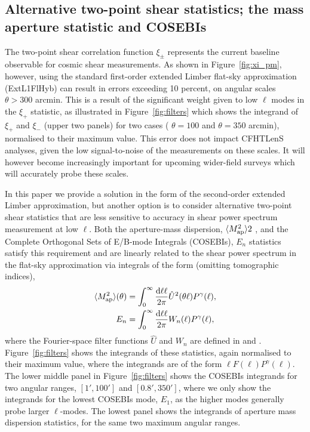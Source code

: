 \subsection{Alternative two-point shear statistics; the mass aperture statistic and COSEBIs}

The two-point shear correlation function $\xi_\pm$ represents the current
baseline observable for cosmic shear measurements.   As shown in
Figure~\ref{fig:xi_pm}, however, using the standard first-order extended
Limber flat-sky approximation (ExtL1FlHyb) can result in errors exceeding 10
percent, on angular scales $\theta > 300$ arcmin.    This is a result of the
significant weight given to low $\ell$ modes in the $\xi_+$ statistic, as
illustrated in Figure~\ref{fig:filters} which shows the integrand of $\xi_+$
and $\xi_-$ (upper two panels) for two cases ( $\theta = 100$ and $\theta =
350$ arcmin), normalised to their maximum value.   This error does not impact
CFHTLenS analyses, given the low signal-to-noise of the measurements on these
scales.  It will however become increasingly important for upcoming wider-field
surveys which will accurately probe these scales.

In this paper we provide a solution in the form of the second-order extended
Limber approximation, but another option is to consider alternative two-point
shear statistics that are less sensitive to accuracy in shear power spectrum
measurement at low $\ell$.   Both the aperture-mass dispersion, $\langle M_
{\rm ap}^2 \rangle2$ \citep{1998MNRAS.296..873S}, and the Complete Orthogonal
Sets of E/B-mode Integrals (COSEBIs), $E_n$ \citep{COSEBIs} statistics satisfy
this requirement and are linearly related to the shear power spectrum in the
flat-sky approximation via integrals of the form (omitting tomographic
indices),
%
\begin{align}
  \langle M_ {\rm ap}^2 \rangle(\theta) & = \int_0^{\infty}\frac{{\rm d} \ell \ell}{2\pi}
  \hat U^2(\theta\ell) P^\gamma(\ell),
  \label{eqn:integ}
  \\
  E_n & = \int_0^{\infty}\frac{{\rm d} \ell \ell}{2\pi} W_n(\ell) P^\gamma(\ell),
\end{align}
%
where the Fourier-space filter functions $\hat U$ and $W_n$ are defined in
\cite{1998MNRAS.296..873S} and \cite{COSEBIs}. 
Figure~\ref{fig:filters} shows the integrands of these statistics, again normalised to their maximum
value, where the integrands are of the form $\ell F(\ell) P^\gamma(\ell)$.  
The lower middle panel in Figure~\ref{fig:filters} shows the
COSEBIs integrands for two angular ranges, $[1',100']$ and $[0.8',350']$, where
we only show the integrands for the lowest COSEBIs mode, $E_1$, as the higher
modes generally probe larger $\ell$-modes.  The lowest panel shows the
integrands of aperture mass dispersion statistics, for the same two maximum
angular ranges. 


